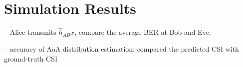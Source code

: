 \section{Simulation Results}
-- Alice transmits $\hat{h}_{AB}x$, compare the average BER at Bob and Eve.

-- accuracy of AoA distribution estimation: compared the predicted CSI with ground-truth CSI